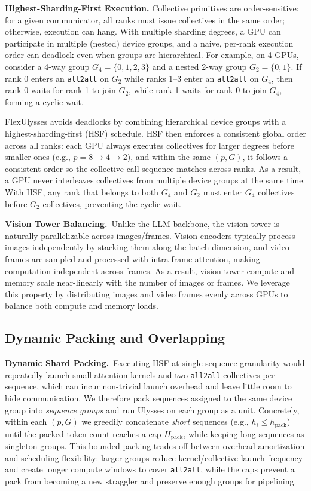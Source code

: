 \noindent\textbf{Highest-Sharding-First Execution.} Collective primitives are order-sensitive: for a given communicator, all ranks must issue collectives in the same order; otherwise, execution can hang. With multiple sharding degrees, a GPU can participate in multiple (nested) device groups, and a naive, per-rank execution order can deadlock even when groups are hierarchical. For example, on 4 GPUs, consider a 4-way group $G_4{=}\{0,1,2,3\}$ and a nested 2-way group $G_2{=}\{0,1\}$. If rank 0 enters an \texttt{all2all} on $G_2$ while ranks 1--3 enter an \texttt{all2all} on $G_4$, then rank 0 waits for rank 1 to join $G_2$, while rank 1 waits for rank 0 to join $G_4$, forming a cyclic wait.

FlexUlysses avoids deadlocks by combining hierarchical device groups with a highest-sharding-first (HSF) schedule. HSF then enforces a consistent global order across all ranks: each GPU always executes collectives for larger degrees before smaller ones (e.g., $p{=}8 \rightarrow 4 \rightarrow 2$), and within the same $(p, G)$, it follows a consistent order so the collective call sequence matches across ranks. As a result, a GPU never interleaves collectives from multiple device groups at the same time. With HSF, any rank that belongs to both $G_4$ and $G_2$ must enter $G_4$ collectives before $G_2$ collectives, preventing the cyclic wait.

\noindent\textbf{Vision Tower Balancing.}~Unlike the LLM backbone, the vision tower is naturally parallelizable across images/frames. Vision encoders typically process images independently by stacking them along the batch dimension, and video frames are sampled and processed with intra-frame attention, making computation independent across frames. As a result, vision-tower compute and memory scale near-linearly with the number of images or frames. We leverage this property by distributing images and video frames evenly across GPUs to balance both compute and memory loads.

\subsection{Dynamic Packing and Overlapping}

\noindent\textbf{Dynamic Shard Packing.}~Executing HSF at single-sequence granularity would repeatedly launch small attention kernels and two \texttt{all2all} collectives per sequence, which can incur non-trivial launch overhead and leave little room to hide communication. We therefore pack sequences assigned to the same device group into \emph{sequence groups} and run Ulysses on each group as a unit. Concretely, within each $(p,G)$ we greedily concatenate \emph{short} sequences (e.g., $h_i \le h_{\text{pack}}$) until the packed token count reaches a cap $H_{\text{pack}}$, while keeping long sequences as singleton groups. This bounded packing trades off between overhead amortization and scheduling flexibility: larger groups reduce kernel/collective launch frequency and create longer compute windows to cover \texttt{all2all}, while the caps prevent a pack from becoming a new straggler and preserve enough groups for pipelining.

